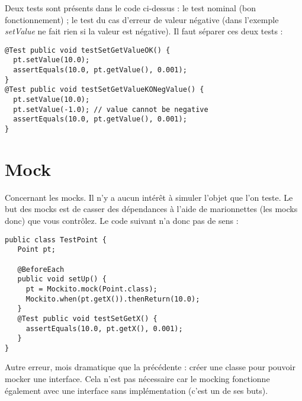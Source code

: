 \documentclass{article}
\newcommand{\Bad}{\vspace*{-0.15cm}\noindent{\huge \fontspec{DejaVu Sans} ☹\\😱}}
\newcommand{\Good}{\vspace*{-0.15cm}\noindent{\huge \fontspec{DejaVu Sans} 😃\\😍} }
\begin{document}
Deux tests sont présents dans le code ci-dessus :
le test nominal (bon fonctionnement) ;
le test du cas d'erreur de valeur négative (dans l'exemple \emph{setValue} ne fait rien si la valeur est négative).
Il faut séparer ces deux tests :

\medskip
\begin{minipage}{0.07\textwidth}
\Good
\end{minipage}%
\begin{minipage}{0.9\textwidth}
\begin{lstlisting}[language=MyJava]
@Test public void testSetGetValueOK() {
  pt.setValue(10.0);
  assertEquals(10.0, pt.getValue(), 0.001);
}
@Test public void testSetGetValueKONegValue() {
  pt.setValue(10.0);
  pt.setValue(-1.0); // value cannot be negative
  assertEquals(10.0, pt.getValue(), 0.001);
}
\end{lstlisting}
\end{minipage}

\newpage

\section*{Mock}

Concernant les mocks. Il n'y a aucun intérêt à simuler l'objet que l'on teste.
Le but des mocks est de casser des dépendances à l'aide de marionnettes (les mocks donc) que vous contrôlez.
Le code suivant n'a donc pas de sens :

\medskip
\begin{minipage}{0.07\textwidth}
\Bad
\end{minipage}%
\begin{minipage}{0.9\textwidth}
\begin{lstlisting}[language=MyJava]
public class TestPoint {
   Point pt;

   @BeforeEach
   public void setUp() {
     pt = Mockito.mock(Point.class);
     Mockito.when(pt.getX()).thenReturn(10.0);
   }
   @Test public void testSetGetX() {
     assertEquals(10.0, pt.getX(), 0.001);
   }
}
\end{lstlisting}
\end{minipage}

Autre erreur, mois dramatique que la précédente :
créer une classe pour pouvoir mocker une interface.
Cela n'est pas nécessaire car le mocking fonctionne également avec une interface sans implémentation (c'est un de ses buts).
\end{document}
